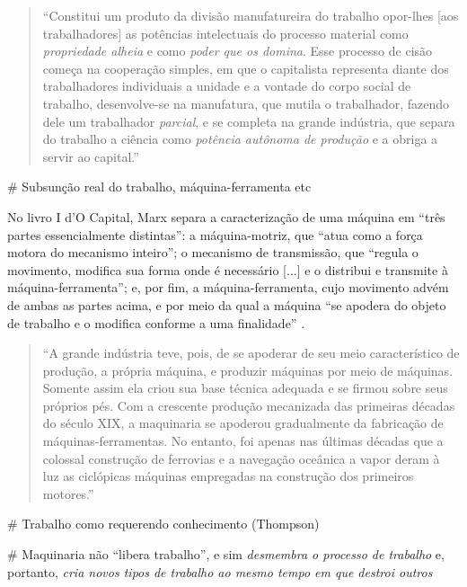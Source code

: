 \begin{quote}
    ``Constitui um produto da divisão manufatureira do trabalho opor-lhes [aos trabalhadores] as potências intelectuais do processo material como \textit{propriedade alheia} e como \textit{poder que os domina}. Esse processo de cisão começa na cooperação simples, em que o capitalista representa diante dos trabalhadores individuais a unidade e a vontade do corpo social de trabalho, desenvolve-se na manufatura, que mutila o trabalhador, fazendo dele um trabalhador \textit{parcial}, e se completa na grande indústria, que separa do trabalho a ciência como \textit{potência autônoma de produção} e a obriga a servir ao capital.'' \parencite[p. 435, grifo meu]{Marx2017}
\end{quote}


\# Subsunção real do trabalho, máquina-ferramenta etc


No livro I d'O Capital, Marx separa a caracterização de uma máquina em ``três partes essencialmente distintas'': a máquina-motriz, que ``atua como a força motora do mecanismo inteiro''; o mecanismo de transmissão, que ``regula o movimento, modifica sua forma onde é necessário [...] e o distribui e transmite à máquina-ferramenta''; e, por fim, a máquina-ferramenta, cujo movimento advém de ambas as partes acima, e por meio da qual a máquina ``se apodera do objeto de trabalho e o modifica conforme a uma finalidade'' \parencite[p. 446-7]{Marx2017}.



\begin{quote}
    ``A grande indústria teve, pois, de se apoderar de seu meio característico de produção, a própria máquina, e produzir máquinas por meio de máquinas. Somente assim ela criou sua base técnica adequada e se firmou sobre seus próprios pés. Com a crescente produção mecanizada das primeiras décadas do século XIX, a maquinaria se apoderou gradualmente da fabricação de máquinas-ferramentas. No entanto, foi apenas nas últimas décadas que a colossal construção de ferrovias e a navegação oceânica a vapor deram à luz as ciclópicas máquinas empregadas na construção dos primeiros motores.'' \parencite[p. 458]{Marx2017}
\end{quote}

\# Trabalho como requerendo conhecimento (Thompson) \textcite[p. 85]{Pasquinelli2023}

\# Maquinaria não ``libera trabalho'', e sim \textit{desmembra o processo de trabalho} e, portanto, \textit{cria novos tipos de trabalho ao mesmo tempo em que destroi outros}


